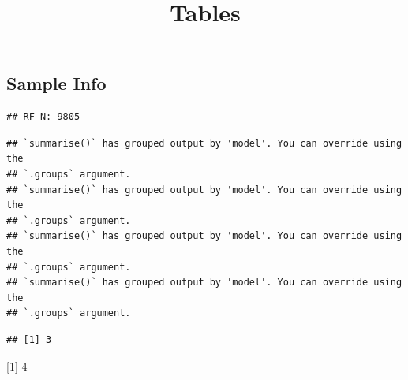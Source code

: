 \documentclass[
]{article}
\title{Tables}
\author{}
\date{\vspace{-2.5em}}
\begin{document}
\maketitle

\subsection{Sample Info}\label{sample-info}

\begin{verbatim}
## RF N: 9805
\end{verbatim}

\begin{verbatim}
## `summarise()` has grouped output by 'model'. You can override using the
## `.groups` argument.
## `summarise()` has grouped output by 'model'. You can override using the
## `.groups` argument.
## `summarise()` has grouped output by 'model'. You can override using the
## `.groups` argument.
## `summarise()` has grouped output by 'model'. You can override using the
## `.groups` argument.
\end{verbatim}

\begin{verbatim}
## [1] 3
\end{verbatim}

{[}1{]} 4
\end{document}
